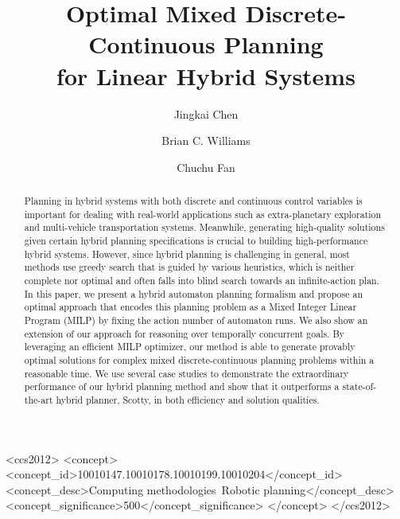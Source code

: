 \documentclass[sigconf]{acmart}
\begin{document}
\fancyhead{}
\def\thetitle{Optimal Mixed Discrete-Continuous Planning \\ for  Linear Hybrid Systems}
\title{\thetitle}

\author{Jingkai Chen}

\author{Brian C. Williams}

\author{Chuchu Fan}

\begin{abstract}
Planning in hybrid systems with both discrete and continuous control variables is important for dealing with real-world applications such as extra-planetary exploration and multi-vehicle transportation systems. Meanwhile, generating high-quality solutions given certain hybrid planning specifications is crucial to building high-performance hybrid systems. However, since hybrid planning is challenging in general, most methods use greedy search that is guided by various heuristics, which is neither complete nor optimal and often falls into blind search towards an infinite-action plan. In this paper, we present a hybrid automaton planning formalism and propose an optimal approach that encodes this planning problem as a Mixed Integer Linear Program (MILP) by fixing the action number of automaton runs. We also show an extension of our approach for reasoning over temporally concurrent goals. By leveraging an efficient MILP optimizer, our method is able to generate provably optimal solutions for complex mixed discrete-continuous planning problems within a reasonable time. We use several case studies to demonstrate the extraordinary performance of our hybrid planning method and show that it outperforms a state-of-the-art hybrid planner, Scotty, in both efficiency and solution qualities.
\end{abstract}

\begin{CCSXML}
<ccs2012>
   <concept>
       <concept_id>10010147.10010178.10010199.10010204</concept_id>
       <concept_desc>Computing methodologies~Robotic planning</concept_desc>
       <concept_significance>500</concept_significance>
       </concept>
 </ccs2012>
\end{CCSXML}
\end{document}
